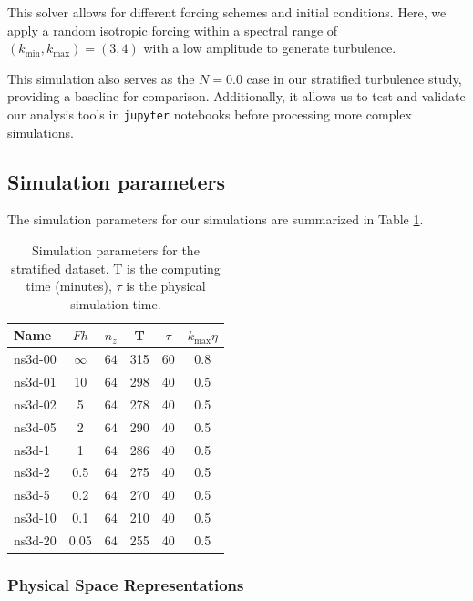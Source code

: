 \documentclass[final,5p,times,twocolumn,authoryear]{elsarticle}
\begin{document}
This solver allows for different forcing schemes and initial conditions. Here, we apply a random isotropic forcing within a spectral range of $(k_{\min}, k_{\max}) = (3,4)$ with a low amplitude to generate turbulence. 

This simulation also serves as the $N=0.0$ case in our stratified turbulence study, providing a baseline for comparison. Additionally, it allows us to test and validate our analysis tools in \texttt{jupyter} notebooks before processing more complex simulations.

\subsection{Simulation parameters}
The simulation parameters for our simulations are summarized in Table \ref{Table1}. 
\begin{table}[h]
\centering
\renewcommand{\arraystretch}{1.5}
\begin{tabular}{l c c c c c} 
 \hline
 Name  & $Fh$ & $n_z$ & T & $\tau$ & $k_{\text{max}} \eta$ \\
 \hline \hline
 ns3d-00 & $\infty$ & $64$ & 315 & 60 & 0.8\\
 ns3d-01 & 10 & $64$ & 298 & 40 & 0.5 \\
 ns3d-02 & 5 & $64$ & 278 & 40 & 0.5 \\
 ns3d-05 & 2 & $64$ & 290 & 40 & 0.5 \\
 ns3d-1 & 1 & $64$ & 286 & 40 & 0.5 \\
 ns3d-2 & 0.5 & $64$ & 275 & 40 & 0.5 \\
 ns3d-5 & 0.2 & $64$ & 270 & 40 & 0.5 \\
 ns3d-10 & 0.1 & $64$ & 210 & 40 & 0.5 \\ 
 ns3d-20 & 0.05 & $64$ & 255 & 40 & 0.5 \\ 
 \hline
\end{tabular}
\caption{Simulation parameters for the stratified dataset. T is the computing time (minutes), $\tau$ is the physical simulation time.\label{Table1}}
\end{table}

\subsubsection{Physical Space Representations}
\end{document}
